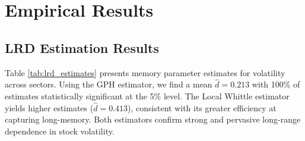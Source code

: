 \documentclass[12pt,a4paper]{article}
\begin{document}
\section{Empirical Results}
\label{sec:results}

\subsection{LRD Estimation Results}

Table \ref{tab:lrd_estimates} presents memory parameter estimates for volatility across sectors. Using the GPH estimator, we find a mean $\hat{d} = 0.213$ with 100\% of estimates statistically significant at the 5\% level. The Local Whittle estimator yields higher estimates ($\hat{d} = 0.413$), consistent with its greater efficiency at capturing long-memory. Both estimators confirm strong and pervasive long-range dependence in stock volatility.
\end{document}
